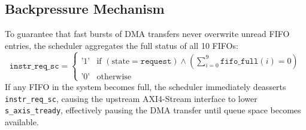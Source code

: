 \subsection{Backpressure Mechanism}
To guarantee that fast bursts of DMA transfers never overwrite unread FIFO entries, the scheduler aggregates the full status of all 10 FIFOs:
\begin{equation}
\texttt{instr\_req\_sc} = \begin{cases} 
\text{'1'} & \text{if } (\text{state} = \texttt{request}) \land \left(\sum_{i=0}^{9} \texttt{fifo\_full}(i) = 0\right) \\ 
\text{'0'} & \text{otherwise} 
\end{cases}
\end{equation}
If any FIFO in the system becomes full, the scheduler immediately deasserts \texttt{instr\_req\_sc}, causing the upstream AXI4-Stream interface to lower \texttt{s\_axis\_tready}, effectively pausing the DMA transfer until queue space becomes available.
